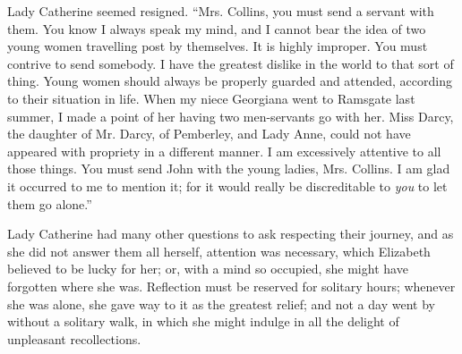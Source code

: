 
Lady Catherine seemed resigned. “Mrs. Collins, you must send a servant with them. You know I always speak my mind, and I cannot bear the idea of two young women travelling post by themselves. It is highly improper. You must contrive to send somebody. I have the greatest dislike in the world to that sort of thing. Young women should always be properly guarded and attended, according to their situation in life. When my niece Georgiana went to Ramsgate last summer, I made a point of her having two men-servants go with her. Miss Darcy, the daughter of Mr. Darcy, of Pemberley, and Lady Anne, could not have appeared with propriety in a different manner. I am excessively attentive to all those things. You must send John with the young ladies, Mrs. Collins. I am glad it occurred to me to mention it; for it would really be discreditable to {\em you} to let them go alone.”



Lady Catherine had many other questions to ask respecting their journey, and as she did not answer them all herself, attention was necessary, which Elizabeth believed to be lucky for her; or, with a mind so occupied, she might have forgotten where she was. Reflection must be reserved for solitary hours; whenever she was alone, she gave way to it as the greatest relief; and not a day went by without a solitary walk, in which she might indulge in all the delight of unpleasant recollections.

